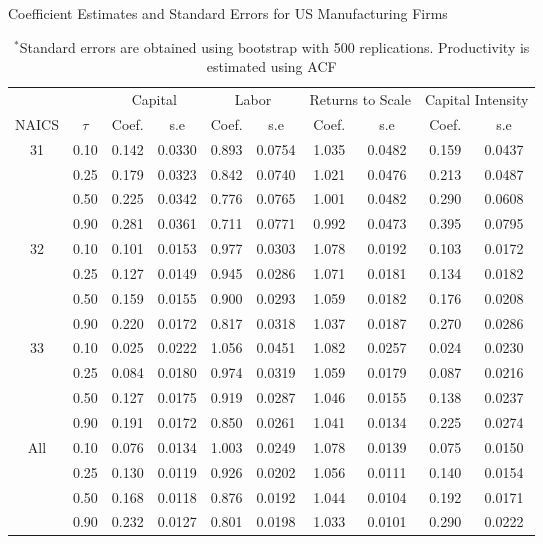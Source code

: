 \documentclass[11pt]{article}
\begin{document}
\begin{table}[H]
\centering
\caption{Coefficient Estimates and Standard Errors for US Manufacturing Firms}
\begin{tabular}{cccccccccc}
  \hline\hline & & \multicolumn{2}{c}{Capital}  & \multicolumn{2}{c}{Labor} & \multicolumn{2}{c}{Returns to Scale} & \multicolumn{2}{c}{Capital Intensity}\\ \cmidrule(lr){3-4} \cmidrule(lr){5-6} \cmidrule(lr){7-8} \cmidrule(lr){9-10}NAICS & $\tau$ & Coef. & s.e & Coef. & s.e & Coef. & s.e & Coef. & s.e \\ 
  \hline
31 & 0.10 & 0.142 & 0.0330 & 0.893 & 0.0754 & 1.035 & 0.0482 & 0.159 & 0.0437 \\ 
   & 0.25 & 0.179 & 0.0323 & 0.842 & 0.0740 & 1.021 & 0.0476 & 0.213 & 0.0487 \\ 
   & 0.50 & 0.225 & 0.0342 & 0.776 & 0.0765 & 1.001 & 0.0482 & 0.290 & 0.0608 \\ 
   & 0.90 & 0.281 & 0.0361 & 0.711 & 0.0771 & 0.992 & 0.0473 & 0.395 & 0.0795 \\ 
  32 & 0.10 & 0.101 & 0.0153 & 0.977 & 0.0303 & 1.078 & 0.0192 & 0.103 & 0.0172 \\ 
   & 0.25 & 0.127 & 0.0149 & 0.945 & 0.0286 & 1.071 & 0.0181 & 0.134 & 0.0182 \\ 
   & 0.50 & 0.159 & 0.0155 & 0.900 & 0.0293 & 1.059 & 0.0182 & 0.176 & 0.0208 \\ 
   & 0.90 & 0.220 & 0.0172 & 0.817 & 0.0318 & 1.037 & 0.0187 & 0.270 & 0.0286 \\ 
  33 & 0.10 & 0.025 & 0.0222 & 1.056 & 0.0451 & 1.082 & 0.0257 & 0.024 & 0.0230 \\ 
   & 0.25 & 0.084 & 0.0180 & 0.974 & 0.0319 & 1.059 & 0.0179 & 0.087 & 0.0216 \\ 
   & 0.50 & 0.127 & 0.0175 & 0.919 & 0.0287 & 1.046 & 0.0155 & 0.138 & 0.0237 \\ 
   & 0.90 & 0.191 & 0.0172 & 0.850 & 0.0261 & 1.041 & 0.0134 & 0.225 & 0.0274 \\ 
  All & 0.10 & 0.076 & 0.0134 & 1.003 & 0.0249 & 1.078 & 0.0139 & 0.075 & 0.0150 \\ 
   & 0.25 & 0.130 & 0.0119 & 0.926 & 0.0202 & 1.056 & 0.0111 & 0.140 & 0.0154 \\ 
   & 0.50 & 0.168 & 0.0118 & 0.876 & 0.0192 & 1.044 & 0.0104 & 0.192 & 0.0171 \\ 
   & 0.90 & 0.232 & 0.0127 & 0.801 & 0.0198 & 1.033 & 0.0101 & 0.290 & 0.0222 \\ 
   \hline
\end{tabular}
\caption*{\footnotesize $^{*}$Standard errors are obtained using bootstrap with 500 replications. Productivity is estimated using ACF}
\label{USestACF}
\end{table}
\end{document}
